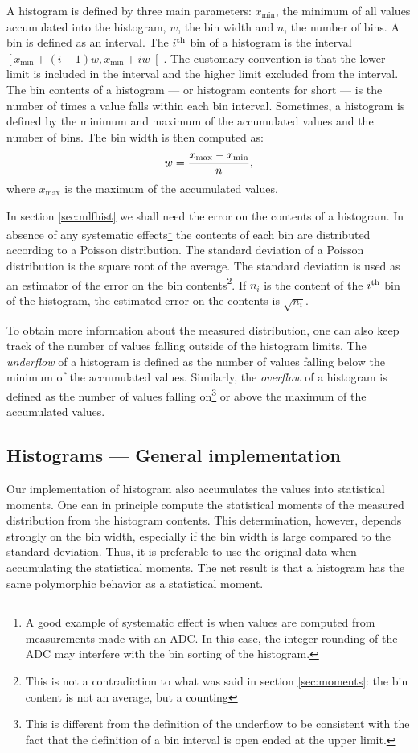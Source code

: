 \documentclass[twoside]{book}
\begin{document}
A histogram is defined by three main parameters: $x_{\min}$, the
minimum of all values accumulated into the histogram, $w$, the bin
width and $n$, the number of bins. A bin is defined as an
interval. The $i^{\mathop{\rm th}}$ bin of a histogram is the interval $\left[
x_{\min}+\left(i-1\right)w, x_{\min}+iw\right[$. The customary
convention is that the lower limit is included in the interval and
the higher limit excluded from the interval. The bin contents of a
histogram --- or histogram contents for short --- is the number of
times a value falls within each bin interval. Sometimes, a
histogram is defined by the minimum and maximum of the accumulated
values and the number of bins. The bin width is then computed as:
\begin{equation}
  w = {x_{\max} - x_{\min} \over n},
\end{equation}
where $x_{\max}$ is the maximum of the accumulated values.

In section \ref{sec:mlfhist} we shall need the error on the
contents of a histogram. In absence of any systematic
effects\footnote{A good example of systematic effect is when
values are computed from measurements made with an ADC. In this
case, the integer rounding of the ADC may interfere with the bin
sorting of the histogram.} the contents of each bin are
distributed according to a Poisson distribution. The standard
deviation of a Poisson distribution is the square root of the
average. The standard deviation is used as an estimator of the
error on the bin contents\footnote{This is not a contradiction to
what was said in section \ref{sec:moments}: the bin content is not
an average, but a counting}. If $n_i$ is the content of the $i^{\mathop{\rm th}}$
bin of the histogram, the estimated error on the contents is
$\sqrt{n_i}$.

To obtain more information about the measured distribution, one
can also keep track of the number of values falling outside of the
histogram limits. The {\sl underflow} of a histogram is defined as
the number of values falling below the minimum  of the accumulated
values. Similarly, the {\sl overflow} of a histogram is defined as
the number of values falling on\footnote{This is different from
the definition of the underflow to be consistent with the fact
that the definition of a bin interval is open ended at the upper
limit.} or above the maximum of the accumulated values.

\subsection{Histograms --- General implementation}
 Our implementation of histogram also
accumulates the values into statistical moments. One can in
principle compute the statistical moments of the measured
distribution from the histogram contents. This determination,
however, depends strongly on the bin width, especially if the bin
width is large compared to the standard deviation. Thus, it is
preferable to use the original data when accumulating the
statistical moments. The net result is that a histogram has the
same polymorphic behavior as a statistical moment.
\end{document}
